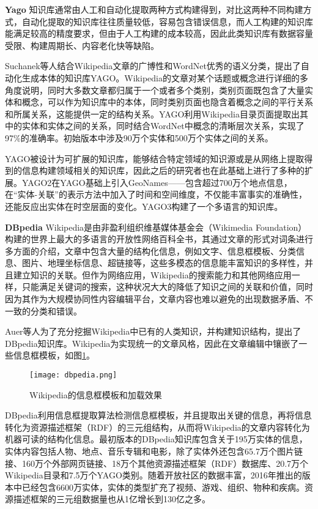 \textbf{Yago}
知识库通常由人工和自动化提取两种方式构建得到，对比这两种不同构建方式，自动化提取的知识库往往质量较低，容易包含错误信息，而人工构建的知识库能满足较高的精度要求，但由于人工构建的成本较高，因此此类知识库有数据容量受限、构建周期长、内容老化快等缺陷。

Suchanek等人结合Wikipedia文章的广博性和WordNet优秀的语义分类，提出了自动化生成本体的知识库YAGO。Wikipedia的文章对某个话题或概念进行详细的多角度说明，同时大多数文章都归属于一个或者多个类别，类别页面既包含了大量实体和概念，可以作为知识库中的本体，同时类别页面也隐含着概念之间的平行关系和所属关系，这能提供一定的结构关系。YAGO利用Wikipedia目录页面提取出其中的实体和实体之间的关系，同时结合WordNet中概念的清晰层次关系，实现了97\%的准确率。初始版本中涉及90万个实体和500万个实体之间的关系。

YAGO被设计为可扩展的知识库，能够结合特定领域的知识源或是从网络上提取得到的信息构建领域相关的知识库，因此之后的研究者也在此基础上进行了多种的扩展。YAGO2在YAGO基础上引入GeoNames——包含超过700万个地点信息，在“实体-关联”的表示方法中加入了时间和空间维度，不仅能丰富事实的准确性，还能反应出实体在时空层面的变化。YAGO3构建了一个多语言的知识库。

\textbf{DBpedia}
Wikipedia是由非盈利组织维基媒体基金会（Wikimedia Foundation）构建的世界上最大的多语言的开放性网络百科全书，其通过文章的形式对词条进行多方面的介绍，文章中包含大量的结构化信息，例如文字、信息框模板、分类信息、图片、地理坐标信息、超链接等，这些多模态的信息能丰富知识的多样性，并且建立知识的关联。但作为网络应用，Wikipedia的搜索能力和其他网络应用一样，只能满足关键词的搜索，这种状况大大的降低了知识之间的关联和价值，同时因为其作为大规模协同性内容编辑平台，文章内容也难以避免的出现数据矛盾、不一致的分类和错误。

Auer等人为了充分挖掘Wikipedia中已有的人类知识，并构建知识结构，提出了DBpedia知识库。Wikipedia为实现统一的文章风格，因此在文章编辑中镶嵌了一些信息框模板，如图\ref{dbpedia}。
\begin{figure}[h]
	\centering
	\texttt{[image: dbpedia.png]}
	\caption{Wikipedia的信息框模板和加载效果}
	\label{dbpedia}
\end{figure}
DBpedia利用信息框提取算法检测信息框模板，并且提取出关键的信息，再将信息转化为资源描述框架（RDF）的三元组结构，从而将Wikipedia的文章内容转化为机器可读的结构化信息。最初版本的DBpedia知识库包含关于195万实体的信息，实体内容包括人物、地点、音乐专辑和电影，除了实体外还包含65.7万个图片链接、160万个外部网页链接、18万个其他资源描述框架（RDF）数据库、20.7万个Wikipedia目录和7.5万个YAGO类别。随着开放社区的数据丰富，2016年推出的版本中已经包含6600万实体，实体的类型扩充了视频、游戏、组织、物种和疾病。资源描述框架的三元组数据量也从1亿增长到130亿之多。

